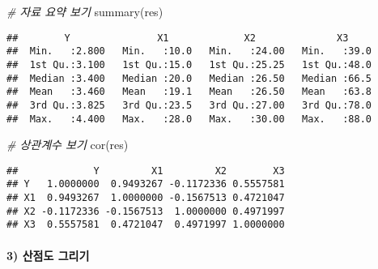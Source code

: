 \documentclass[
]{article}
\newenvironment{Shaded}{\begin{snugshade}}{\end{snugshade}}
\newcommand{\AttributeTok}[1]{\textcolor[rgb]{0.77,0.63,0.00}{#1}}
\newcommand{\CommentTok}[1]{\textcolor[rgb]{0.56,0.35,0.01}{\textit{#1}}}
\newcommand{\DecValTok}[1]{\textcolor[rgb]{0.00,0.00,0.81}{#1}}
\newcommand{\FunctionTok}[1]{\textcolor[rgb]{0.00,0.00,0.00}{#1}}
\newcommand{\NormalTok}[1]{#1}
\newcommand{\SpecialCharTok}[1]{\textcolor[rgb]{0.00,0.00,0.00}{#1}}
\newcommand{\StringTok}[1]{\textcolor[rgb]{0.31,0.60,0.02}{#1}}
\begin{document}
\begin{Shaded}
\begin{Highlighting}[]
\CommentTok{\# 자료 요약 보기}
\FunctionTok{summary}\NormalTok{(res) }
\end{Highlighting}
\end{Shaded}

\begin{verbatim}
##        Y               X1             X2              X3      
##  Min.   :2.800   Min.   :10.0   Min.   :24.00   Min.   :39.0  
##  1st Qu.:3.100   1st Qu.:15.0   1st Qu.:25.25   1st Qu.:48.0  
##  Median :3.400   Median :20.0   Median :26.50   Median :66.5  
##  Mean   :3.460   Mean   :19.1   Mean   :26.50   Mean   :63.8  
##  3rd Qu.:3.825   3rd Qu.:23.5   3rd Qu.:27.00   3rd Qu.:78.0  
##  Max.   :4.400   Max.   :28.0   Max.   :30.00   Max.   :88.0
\end{verbatim}

\begin{Shaded}
\begin{Highlighting}[]
\CommentTok{\# 상관계수 보기}
\FunctionTok{cor}\NormalTok{(res)}
\end{Highlighting}
\end{Shaded}

\begin{verbatim}
##             Y         X1         X2        X3
## Y   1.0000000  0.9493267 -0.1172336 0.5557581
## X1  0.9493267  1.0000000 -0.1567513 0.4721047
## X2 -0.1172336 -0.1567513  1.0000000 0.4971997
## X3  0.5557581  0.4721047  0.4971997 1.0000000
\end{verbatim}

\hypertarget{uxc0b0uxc810uxb3c4-uxadf8uxb9acuxae30}{%
\paragraph{3) 산점도
그리기}\label{uxc0b0uxc810uxb3c4-uxadf8uxb9acuxae30}}

\begin{Shaded}
\end{Shaded}
\end{document}
